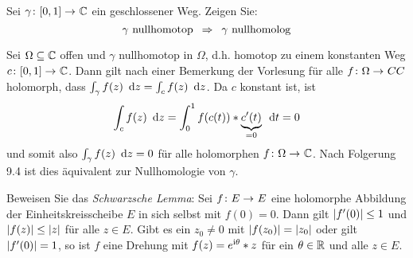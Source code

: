 \begin{exercisePage}
	
	\begin{task}
		Sei $\abb{\gamma}{[0,1]}{\CC}$ ein geschlossener Weg. Zeigen Sie:
		\begin{equation*}
			\gamma \text{ nullhomotop} \enskip \Rightarrow \enskip \gamma \text{ nullhomolog}
		\end{equation*}		
	\end{task}

	Sei $\Omega \subseteq \mathbb{C}$ offen und $\gamma$ nullhomotop in $\Omega$, d.h. homotop zu einem konstanten Weg $\abb{c}{[0,1]}{\CC}$. Dann gilt nach einer Bemerkung der Vorlesung für alle $\abb{f}{\Omega}{CC}$ holomorph, dass $\int_\gamma f(z) \enskip \mathrm{d}z = \int_c f(z) \enskip \mathrm{d}z$. Da $c$ konstant ist, ist 
	\begin{equation*}
		\int_c f(z) \enskip \mathrm{d}z = \int_0^1 f(c(t)) * \underbrace{c'(t)}_{=0} \enskip \mathrm{d}t = 0
	\end{equation*}
	und somit also $\int_\gamma f(z) \enskip \mathrm{d}z = 0$ für alle holomorphen $\abb{f}{\Omega}{\CC}$. Nach Folgerung 9.4 ist dies äquivalent zur Nullhomologie von $\gamma$.
	
	
	\begin{task}
		Beweisen Sie das \textit{Schwarzsche Lemma}: Sei $\abb{f}{E}{E}$ eine holomorphe Abbildung der Einheitskreisscheibe $E$ in sich selbst mit $f(0) = 0$. Dann gilt $\left| f'(0) \right| \le 1$ und $\left| f(z) \right| \le \left| z \right|$ für alle $z \in E$. Gibt es ein $z_0 \neq 0$ mit $\left| f(z_0) \right| = \left| z_0 \right|$ oder gilt $\left| f'(0) \right| = 1$, so ist $f$ eine Drehung mit $f(z) = e^{\mathrm{i} \theta} * z$ für ein $\theta \in \mathbb{R}$ und alle $z \in E$.
	\end{task}


\end{exercisePage}
